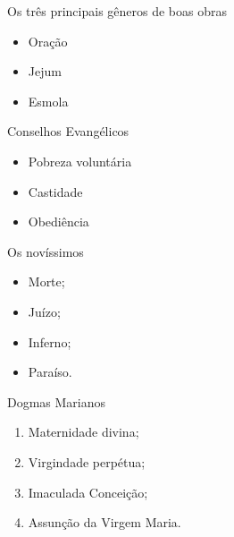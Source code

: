 \documentclass{book}
\begin{document}
\begin{center}
    Os três principais gêneros de boas obras
\end{center}
\begin{itemize}
    \item Oração
    \item Jejum
    \item Esmola
\end{itemize}
\begin{center}
    Conselhos Evangélicos
\end{center}
\begin{itemize}
    \item Pobreza voluntária
    \item Castidade
    \item Obediência
\end{itemize}
\begin{center}
    Os novíssimos
\end{center}
\begin{itemize}
    \item Morte;
    \item Juízo;
    \item Inferno;
    \item Paraíso.
\end{itemize}
\begin{center}
    Dogmas Marianos
\end{center}
\begin{enumerate}
    \item Maternidade divina;
    \item Virgindade perpétua;
    \item Imaculada Conceição;
    \item Assunção da Virgem Maria.
\end{enumerate}
\end{document}
